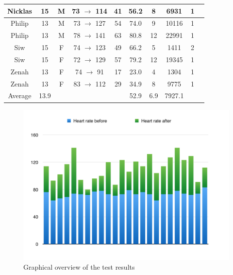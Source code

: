 \documentclass[11pt]{report}
\begin{document}
\begin{table}[H]
\begin{tabular}{ | c | c | c | c | c | c | c | c | c | c |}
Nicklas & 15 & M & 73 $\rightarrow$ 114 & 41 & 56.2 & 8 & 6931 & 1\\ \hline 
Philip & 13 & M & 73 $\rightarrow$ 127 & 54 & 74.0 & 9 & 10116 & 1\\ \hline 
Philip & 13 & M & 78 $\rightarrow$ 141 & 63 & 80.8 &12 & 22991& 1\\ \hline 
Siw & 15 & F & 74 $\rightarrow$ 123 & 49 & 66.2 & 5 & 1411 & 2\\ \hline 
Siw & 15 & F & 72 $\rightarrow$ 129 & 57 & 79.2 & 12 & 19345 & 1\\ \hline 
Zenah & 13 & F & 74 $\rightarrow$ 91 & 17 & 23.0 & 4 & 1304 & 1\\ \hline 
Zenah & 13 & F & 83 $\rightarrow$ 112 & 29 & 34.9 & 8 & 9775 & 1\\ \hline
Average & 13.9 & \multicolumn{2}{r}{} & & 52.9 & 6.9 & 7927.1 & \\ \hline
\end{tabular}
\end{table}

\begin{figure}[H]
	\centering
	\includegraphics[scale=0.6]{../GFX/Resultsgraph.png}
	\caption{Graphical overview of the test results}
\end{figure}
\end{document}
